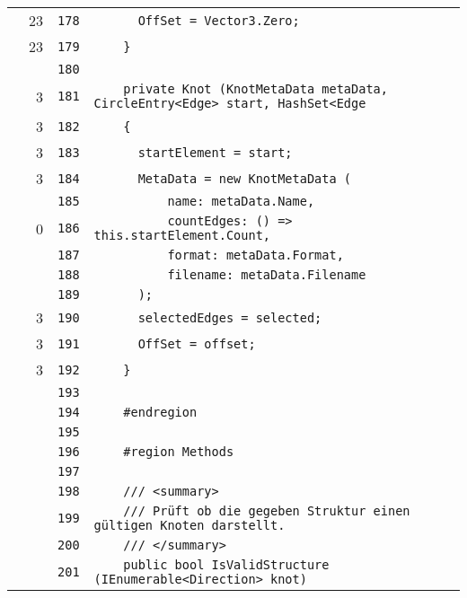 \documentclass[a4paper,10pt]{article}
\begin{document}
\begin{longtable}[l]{lrrl}
\cellcolor{green} & 23 & \verb~178~ & \verb~      OffSet = Vector3.Zero;~\\
\cellcolor{green} & 23 & \verb~179~ & \verb~    }~\\
\cellcolor{gray} &  & \verb~180~ & \verb~~\\
\cellcolor{green} & 3 & \verb~181~ & \verb~    private Knot (KnotMetaData metaData, CircleEntry<Edge> start, HashSet<Edge~\\
\cellcolor{green} & 3 & \verb~182~ & \verb~    {~\\
\cellcolor{green} & 3 & \verb~183~ & \verb~      startElement = start;~\\
\cellcolor{green} & 3 & \verb~184~ & \verb~      MetaData = new KnotMetaData (~\\
\cellcolor{gray} &  & \verb~185~ & \verb~          name: metaData.Name,~\\
\cellcolor{red} & 0 & \verb~186~ & \verb~          countEdges: () => this.startElement.Count,~\\
\cellcolor{gray} &  & \verb~187~ & \verb~          format: metaData.Format,~\\
\cellcolor{gray} &  & \verb~188~ & \verb~          filename: metaData.Filename~\\
\cellcolor{gray} &  & \verb~189~ & \verb~      );~\\
\cellcolor{green} & 3 & \verb~190~ & \verb~      selectedEdges = selected;~\\
\cellcolor{green} & 3 & \verb~191~ & \verb~      OffSet = offset;~\\
\cellcolor{green} & 3 & \verb~192~ & \verb~    }~\\
\cellcolor{gray} &  & \verb~193~ & \verb~~\\
\cellcolor{gray} &  & \verb~194~ & \verb~    #endregion~\\
\cellcolor{gray} &  & \verb~195~ & \verb~~\\
\cellcolor{gray} &  & \verb~196~ & \verb~    #region Methods~\\
\cellcolor{gray} &  & \verb~197~ & \verb~~\\
\cellcolor{gray} &  & \verb~198~ & \verb~    /// <summary>~\\
\cellcolor{gray} &  & \verb~199~ & \verb~    /// Prüft ob die gegeben Struktur einen gültigen Knoten darstellt.~\\
\cellcolor{gray} &  & \verb~200~ & \verb~    /// </summary>~\\
\cellcolor{gray} &  & \verb~201~ & \verb~    public bool IsValidStructure (IEnumerable<Direction> knot)~\\

\end{longtable}
\end{document}
